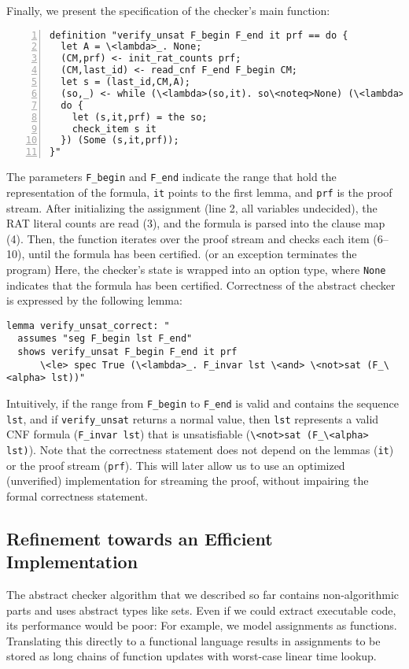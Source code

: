 \documentclass[smallcondensed]{svjour3}     %
\newcommand{\isai}{\lstinline[language=isabelle,basicstyle=\normalsize\ttfamily\slshape]}
\begin{document}
Finally, we present the specification of the checker's main function:
\begin{lstlisting}[numbers=left, xleftmargin=2em]
definition "verify_unsat F_begin F_end it prf == do {
  let A = \<lambda>_. None;
  (CM,prf) <- init_rat_counts prf;
  (CM,last_id) <- read_cnf F_end F_begin CM;
  let s = (last_id,CM,A);
  (so,_) <- while (\<lambda>(so,it). so\<noteq>None) (\<lambda>(so,it). 
  do {
    let (s,it,prf) = the so;
    check_item s it
  }) (Some (s,it,prf));
}"
\end{lstlisting}
The parameters \isai{F_begin} and \isai{F_end} indicate the range that hold the representation of the formula, \isai{it} points to the 
first lemma, and \isai{prf} is the proof stream.
After initializing the assignment (line 2, all variables undecided), the RAT literal counts are read (3), and the formula is parsed into the clause map (4).
Then, the function iterates over the proof stream and checks each item (6--10), until the formula has been certified. (or an exception terminates the program)
Here, the checker's state is wrapped into an option type, where \isai{None} indicates that the formula has been certified. 
%
Correctness of the abstract checker is expressed by the following lemma:
\begin{lstlisting}
lemma verify_unsat_correct: "
  assumes "seg F_begin lst F_end"
  shows verify_unsat F_begin F_end it prf
      \<le> spec True (\<lambda>_. F_invar lst \<and> \<not>sat (F_\<alpha> lst))"
\end{lstlisting}
Intuitively, if the range from \isai{F_begin} to \isai{F_end} is valid and contains the sequence \isai{lst},
and if \isai{verify_unsat} returns a normal value, then \isai{lst} represents a valid CNF formula (\isai{F_invar lst}) 
that is unsatisfiable (\isai{\<not>sat (F_\<alpha> lst)}). Note that the correctness statement does not depend on the 
lemmas (\isai{it}) or the proof stream (\isai{prf}). This will later allow us to use an optimized (unverified) 
implementation for streaming the proof, without impairing the formal correctness statement.

\subsection{Refinement towards an Efficient Implementation}    
The abstract checker algorithm that we described so far contains non-algorithmic parts and uses abstract types like sets.
Even if we could extract executable code, its performance would be poor: For example, we model assignments as functions. Translating 
this directly to a functional language results in assignments to be stored as long chains of function updates with worst-case linear time lookup.
\end{document}
